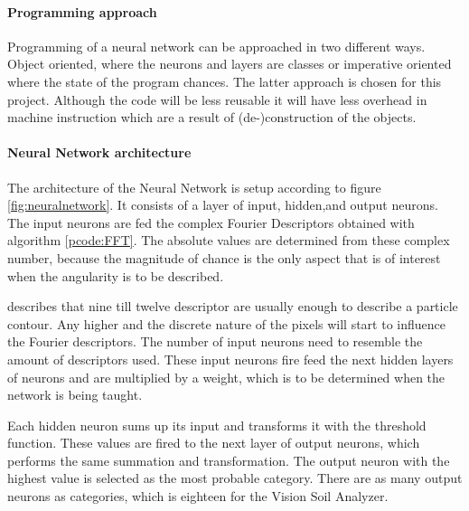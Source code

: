 \documentclass[11pt,fleqn,,a4paper,twoside,openright]{book}
\begin{document}
\paragraph{Programming approach}
Programming of a neural network can be approached in two different ways. Object oriented, where the neurons and layers are classes or imperative oriented where the state of the program chances. The latter approach is chosen for this project. Although the code will be less reusable it will have less overhead in machine instruction which are a result of (de-)construction of the objects.

\paragraph{Neural Network architecture}\label{NNArchitecture}
The architecture of the Neural Network is setup according to figure \ref{fig:neuralnetwork}. It consists of a layer of input, hidden,and output neurons. The input neurons are fed the complex Fourier Descriptors obtained with algorithm \ref{pcode:FFT}. The absolute values are determined from these complex number, because the magnitude of chance is the only aspect that is of interest when the angularity is to be described.

\citeauthor{Spijker14a} \cite{Spijker14a} describes that nine till twelve  descriptor are usually enough to describe a particle contour. Any higher and the discrete nature of the pixels will start to influence the Fourier descriptors. The number of input neurons need to resemble the amount of descriptors used. These input neurons fire feed the next hidden layers of neurons and are multiplied by a weight, which is to be determined when the network is being taught.

Each hidden neuron sums up its input and transforms it with the threshold function. These values are fired to the next layer of output neurons, which performs the same summation and transformation. The output neuron with the highest value is selected as the most probable category. There are as many output neurons as categories, which is eighteen for the Vision Soil Analyzer.
\end{document}

